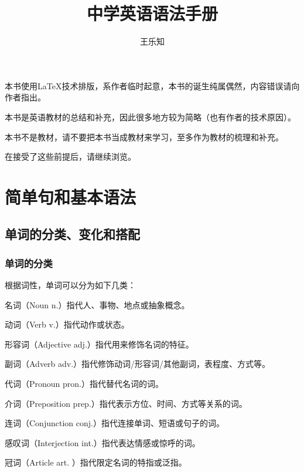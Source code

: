 \documentclass[UTF8]{ctexbook}
\title{中学英语语法手册}
\author{王乐知\and徐晨曦}
\begin{document}
\maketitle

\begin{center}
{}
\end{center}

本书使用\LaTeX{}技术排版，系作者临时起意，本书的诞生纯属偶然，内容错误请向作者指出。

本书是英语教材的总结和补充，因此很多地方较为简略（也有作者的技术原因）。

本书不是教材，请不要把本书当成教材来学习，至多作为教材的梳理和补充。

在接受了这些前提后，请继续浏览。

\tableofcontents

\part{简单句和基本语法}

\chapter{单词的分类、变化和搭配}

{}

\section{单词的分类}

根据词性，单词可以分为如下几类：

名词（Noun n.）指代人、事物、地点或抽象概念。

动词（Verb v.）指代动作或状态。

形容词（Adjective adj.）指代用来修饰名词的特征。

副词（Adverb adv.）指代修饰动词/形容词/其他副词，表程度、方式等。

代词（Pronoun pron.）指代替代名词的词。

介词（Preposition prep.）指代表示方位、时间、方式等关系的词。

连词（Conjunction conj.）指代连接单词、短语或句子的词。

感叹词（Interjection int.）指代表达情感或惊呼的词。

冠词（Article art. ）指代限定名词的特指或泛指。
\end{document}

